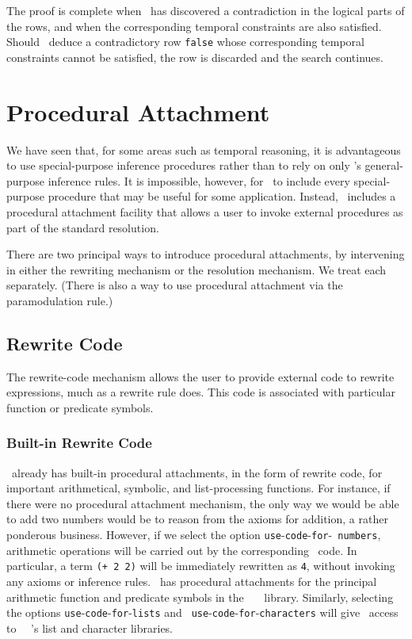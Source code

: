 The proof is complete when \snark\  has discovered a contradiction in the
logical parts of the rows, and when the corresponding temporal constraints
are also satisfied.  Should \snark\  deduce a contradictory row {\tt false}
whose corresponding temporal constraints cannot be satisfied, the row is
discarded and the search continues.


\section{Procedural Attachment}
\label{sec-procedural-attachment}

We have seen that, for some areas such as temporal reasoning, it is
advantageous to use special-purpose inference procedures rather than to rely
on only \snark\/'s general-purpose inference rules.  It is impossible,
however, for \snark\  to include every special-purpose procedure that may be
useful for some application.  Instead, \snark\  includes a procedural
attachment facility that allows a user to invoke external procedures as part
of the standard resolution.

There are two principal ways to introduce procedural attachments, by
intervening in either the rewriting mechanism or the resolution mechanism.
We treat each separately.  (There is also a way to use procedural attachment
via the paramodulation rule.)

\subsection{Rewrite Code}
\label{subsec-rewrite-code}

The rewrite-code mechanism allows the user to provide external code to
rewrite expressions, much as a rewrite rule does.  This code is
associated with particular function or predicate symbols.

\subsubsection{Built-in Rewrite Code}
\Snark\   already has built-in procedural attachments, in the form of rewrite
code, for important arithmetical, symbolic, and list-processing functions.
For instance, if there were no procedural attachment mechanism, the only way
we would be able to add two numbers would be to reason from the axioms for
addition, a rather ponderous business.  However,
if we select the option {\tt use}-{\tt code}-{\tt for}-{\tt
numbers}, arithmetic operations will be carried out by the corresponding
\lisp\   code.  In particular, a term \verb'(+ 2 2)' will be immediately
rewritten as {\tt 4}, without invoking any axioms or inference rules.
\Snark\   has procedural attachments for  the principal arithmetic function and
predicate symbols in the \ansi\  \kif\  \commonlisp\  library.  Similarly,
selecting the options {\tt use}-{\tt code}-{\tt for}-{\tt lists} and {\tt
use}-{\tt code}-{\tt for}-{\tt characters} will give \snark\  access to
 \ansi\  \kif\  \commonlisp\/'s list and character libraries.

